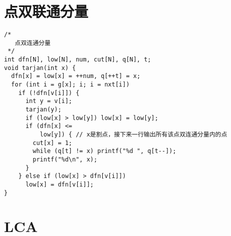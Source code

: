 \section{点双联通分量}

\begin{lstlisting}
/*
   点双连通分量
 */
int dfn[N], low[N], num, cut[N], q[N], t;
void tarjan(int x) {
  dfn[x] = low[x] = ++num, q[++t] = x;
  for (int i = g[x]; i; i = nxt[i])
    if (!dfn[v[i]]) {
      int y = v[i];
      tarjan(y);
      if (low[x] > low[y]) low[x] = low[y];
      if (dfn[x] <=
          low[y]) { // x是割点，接下来一行输出所有该点双连通分量内的点
        cut[x] = 1;
        while (q[t] != x) printf("%d ", q[t--]);
        printf("%d\n", x);
      }
    } else if (low[x] > dfn[v[i]])
      low[x] = dfn[v[i]];
}

\end{lstlisting}

\section{LCA}

